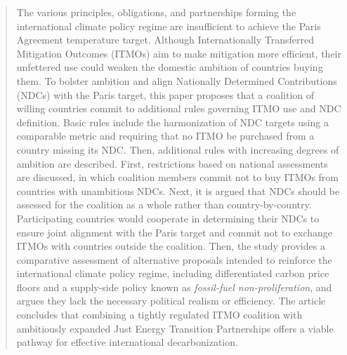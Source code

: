 \documentclass[12pt,english]{article}
\begin{document}
\begin{abstract} %
The various principles, obligations, and partnerships forming the international climate policy regime are insufficient to achieve the Paris Agreement temperature target. Although Internationally Transferred Mitigation Outcomes (ITMOs) aim to make mitigation more efficient, their unfettered use could weaken the domestic ambition of countries buying them. To bolster ambition and align Nationally Determined Contributions (NDCs) with the Paris target, this paper proposes that a coalition of willing countries commit to additional rules governing ITMO use and NDC definition. Basic rules include the harmonization of NDC targets using a comparable metric and requiring that no ITMO be purchased from a country missing its NDC. Then, additional rules with increasing degrees of ambition are described. First, restrictions based on national assessments are discussed, in which coalition members commit not to buy ITMOs from countries with unambitious NDCs. Next, it is argued that NDCs should be assessed for the coalition as a whole rather than country-by-country. Participating countries would cooperate in determining their NDCs to ensure joint alignment with the Paris target and commit not to exchange ITMOs with countries outside the coalition. Then, the study provides a comparative assessment of alternative proposals intended to reinforce the international climate policy regime, including differentiated carbon price floors and a supply-side policy known as \textit{fossil-fuel non-proliferation}, 
and argues they lack the necessary political realism or efficiency. 
The article concludes that combining a tightly regulated ITMO coalition with ambitiously expanded Just Energy Transition Partnerships offers a viable pathway for effective international decarbonization.



\end{abstract}
\end{document}
